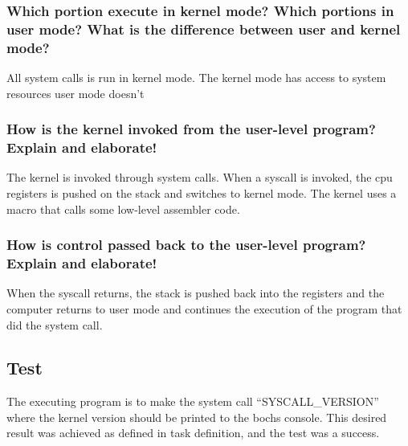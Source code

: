 
\subsubsection*{Which portion execute in kernel mode? Which portions in user mode? What is the difference between user and kernel mode?}
All system calls is run in kernel mode. The kernel mode has access to system resources user mode doesn't

\subsubsection*{How is the kernel invoked from the user-level program? Explain and elaborate!}
The kernel is invoked through system calls. When a syscall is invoked, the cpu registers is pushed on the stack and switches to kernel mode. The kernel uses a macro that calls some low-level assembler code.

\subsubsection*{How is control passed back to the user-level program? Explain and elaborate!}

When the syscall returns, the stack is pushed back into the registers and the computer returns to user mode and continues the execution of the
program that did the system call.

\subsection{Test}
The executing program is to make the system call “SYSCALL\_VERSION” where the kernel version should be printed to the bochs console. This desired result was achieved as defined in task definition, and the test was a success.